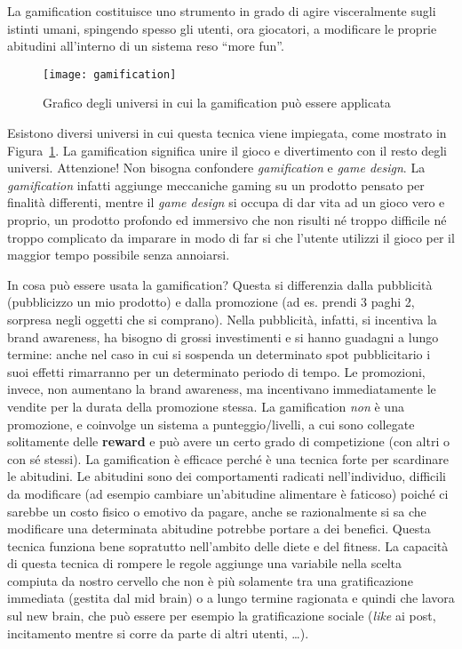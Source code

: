 \noindent La gamification costituisce uno strumento in grado di agire 
visceralmente sugli istinti umani, spingendo spesso gli utenti, ora giocatori, a 
modificare le proprie abitudini all’interno di un sistema reso ``more fun''.

\begin{figure}[t]
 \centering
 \texttt{[image: gamification]}
 \caption[Gamification]{Grafico degli universi in cui la gamification può 
essere applicata}
 \label{fig:neuro:gamification}
\end{figure}

Esistono diversi universi in cui questa tecnica viene impiegata, come 
mostrato in Figura~\ref{fig:neuro:gamification}. La gamification significa 
unire il gioco e divertimento con il resto degli universi. Attenzione! Non 
bisogna confondere \emph{gamification} e \emph{game design}. La 
\emph{gamification} infatti aggiunge meccaniche gaming su un prodotto pensato 
per finalità differenti, mentre il \textit{game design} si occupa di dar vita 
ad un gioco vero e proprio, un prodotto profondo ed immersivo che non risulti 
né troppo difficile né troppo complicato da imparare in modo di far si che 
l'utente utilizzi il gioco per il maggior tempo possibile senza annoiarsi.

In cosa può essere usata la gamification? Questa si differenzia dalla
pubblicità (pubblicizzo un mio prodotto) e dalla promozione (ad es. prendi 3
paghi 2, sorpresa negli oggetti che si comprano). Nella pubblicità, infatti, si
incentiva la brand awareness, ha bisogno di grossi investimenti e si hanno
guadagni a lungo termine: anche nel caso in cui si sospenda un determinato spot
pubblicitario i suoi effetti rimarranno per un determinato periodo di tempo. Le
promozioni, invece, non aumentano la brand awareness, ma incentivano
immediatamente le vendite per la durata della promozione stessa. La
gamification \emph{non} è una promozione, e coinvolge un sistema a
punteggio/livelli, a cui sono collegate solitamente delle \textbf{reward} e può 
avere un certo grado di competizione (con altri o con sé stessi).
La gamification è efficace perché è una tecnica forte per scardinare le
abitudini. Le abitudini sono dei comportamenti radicati nell'individuo,
difficili da modificare (ad esempio cambiare un'abitudine alimentare è
faticoso) poiché ci sarebbe un costo fisico o emotivo da pagare, anche se
razionalmente si sa che modificare una determinata abitudine potrebbe portare a
dei benefici. Questa tecnica funziona bene sopratutto nell'ambito delle diete e
del fitness. La capacità di questa tecnica di rompere le regole aggiunge una
variabile nella scelta compiuta da nostro cervello che non è più solamente tra
una gratificazione immediata (gestita dal mid brain) o a lungo termine 
ragionata e quindi che lavora sul new brain, che può essere per esempio la
gratificazione sociale (\emph{like} ai post, incitamento mentre si corre da
parte di altri utenti, \dots{}).

